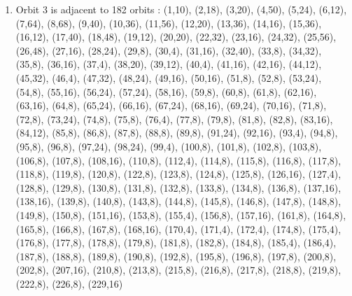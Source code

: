 \documentclass[12pt]{article}
\begin{document}
\begin{enumerate}
\item Orbit 3 is adjacent to 182 orbits : (1,10), (2,18), (3,20), (4,50), (5,24), (6,12), (7,64), (8,68), (9,40), (10,36), (11,56), (12,20), (13,36), (14,16), (15,36), (16,12), (17,40), (18,48), (19,12), (20,20), (22,32), (23,16), (24,32), (25,56), (26,48), (27,16), (28,24), (29,8), (30,4), (31,16), (32,40), (33,8), (34,32), (35,8), (36,16), (37,4), (38,20), (39,12), (40,4), (41,16), (42,16), (44,12), (45,32), (46,4), (47,32), (48,24), (49,16), (50,16), (51,8), (52,8), (53,24), (54,8), (55,16), (56,24), (57,24), (58,16), (59,8), (60,8), (61,8), (62,16), (63,16), (64,8), (65,24), (66,16), (67,24), (68,16), (69,24), (70,16), (71,8), (72,8), (73,24), (74,8), (75,8), (76,4), (77,8), (79,8), (81,8), (82,8), (83,16), (84,12), (85,8), (86,8), (87,8), (88,8), (89,8), (91,24), (92,16), (93,4), (94,8), (95,8), (96,8), (97,24), (98,24), (99,4), (100,8), (101,8), (102,8), (103,8), (106,8), (107,8), (108,16), (110,8), (112,4), (114,8), (115,8), (116,8), (117,8), (118,8), (119,8), (120,8), (122,8), (123,8), (124,8), (125,8), (126,16), (127,4), (128,8), (129,8), (130,8), (131,8), (132,8), (133,8), (134,8), (136,8), (137,16), (138,16), (139,8), (140,8), (143,8), (144,8), (145,8), (146,8), (147,8), (148,8), (149,8), (150,8), (151,16), (153,8), (155,4), (156,8), (157,16), (161,8), (164,8), (165,8), (166,8), (167,8), (168,16), (170,4), (171,4), (172,4), (174,8), (175,4), (176,8), (177,8), (178,8), (179,8), (181,8), (182,8), (184,8), (185,4), (186,4), (187,8), (188,8), (189,8), (190,8), (192,8), (195,8), (196,8), (197,8), (200,8), (202,8), (207,16), (210,8), (213,8), (215,8), (216,8), (217,8), (218,8), (219,8), (222,8), (226,8), (229,16)

\end{enumerate}
\end{document}
